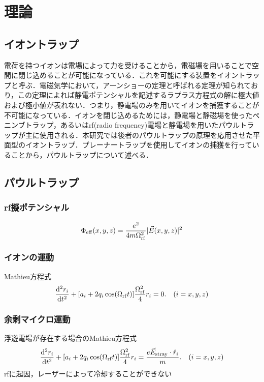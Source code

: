 \chapter{理論}
\section{イオントラップ}
電荷を持つイオンは電場によって力を受けることから，電磁場を用いることで空間に閉じ込めることが可能になっている．これを可能にする装置をイオントラップと呼ぶ．電磁気学において，アーンショーの定理と呼ばれる定理が知られており，この定理によれば静電ポテンシャルを記述するラプラス方程式の解に極大値および極小値が表れない．つまり，静電場のみを用いてイオンを捕獲することが不可能になっている．イオンを閉じ込めるためには，静電場と静磁場を使ったペニンブトラップ，あるいはrf(radio frequency)電場と静電場を用いたパウルトラップが主に使用される．本研究では後者のパウルトラップの原理を応用させた平面型のイオントラップ．プレーナートラップを使用してイオンの捕獲を行っていることから，パウルトラップについて述べる．
\section{パウルトラップ}
\subsection{rf擬ポテンシャル}
\large
\begin{align}
	\Phi_{\rm eff}(x,y,z) = \frac{e^2}{4m\Omega_{\rm rf}^2}|\vec{E}(x,y,z)|^2
\end{align}
\normalsize
\subsection{イオンの運動}
Mathieu方程式
\large
\begin{align}
	\frac{{\rm d^2}r_i}{{\rm d}t^2} + [a_i + 2q_i \cos (\Omega_{\rm rf} t)]\frac{\Omega_{\rm rf}^2}{4}r_i = 0. \quad (i = x,y,z)
\end{align}
\normalsize
\subsection{余剰マイクロ運動}
浮遊電場が存在する場合のMathieu方程式
\large
\begin{align}
	\frac{{\rm d^2}r_i}{{\rm d}t^2} + [a_i + 2q_i \cos (\Omega_{\rm rf} t)]\frac{\Omega_{\rm rf}^2}{4}r_i = \frac{e\vec{E}_{\rm stray}\cdot \hat{r}_i}{m}. \quad (i = x,y,z)
\end{align}
\normalsize
rfに起因，レーザーによって冷却することができない
